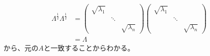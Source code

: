 \begin{align*}
  \Lambda^{\frac{1}{2}} \Lambda^{\frac{1}{2}} & = \left(
                                                    \begin{array}{ccc}
                                                      \sqrt{\lambda_1} &        & \\
                                                                       & \ddots & \\
                                                                       &        & \sqrt{\lambda_n}
                                                    \end{array}
                                                  \right)
                                                  \left(
                                                    \begin{array}{ccc}
                                                      \sqrt{\lambda_1} &        & \\
                                                                       & \ddots & \\
                                                                       &        & \sqrt{\lambda_n}
                                                    \end{array}
                                                  \right) \\
                                              & = \Lambda
\end{align*}
から、元の$A$と一致することからわかる。

